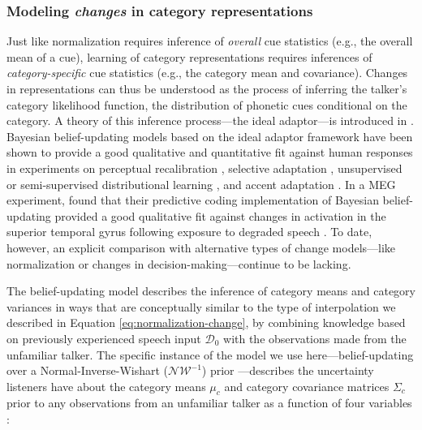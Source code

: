 \documentclass[
  11pt,
  man,floatsintext]{apa6}
\begin{document}
\hypertarget{sec:ideal-adaptor}{%
\subsubsection{\texorpdfstring{Modeling \emph{changes} in category representations}{Modeling changes in category representations}}\label{sec:ideal-adaptor}}

Just like normalization requires inference of \emph{overall} cue statistics (e.g., the overall mean of a cue), learning of category representations requires inferences of \emph{category-specific} cue statistics (e.g., the category mean and covariance). Changes in representations can thus be understood as the process of inferring the talker's category likelihood function, the distribution of phonetic cues conditional on the category. A theory of this inference process---the ideal adaptor---is introduced in \textcite{kleinschmidt-jaeger2015}. Bayesian belief-updating models based on the ideal adaptor framework have been shown to provide a good qualitative and quantitative fit against human responses in experiments on perceptual recalibration \autocites{kleinschmidt-jaeger2011,kleinschmidt-jaeger2012}[for closely related models, see][]{xie2021cognition}, selective adaptation \autocite{kleinschmidt-jaeger2016pbr}, unsupervised or semi-supervised distributional learning \autocites[e.g.,][]{kim2020,kleinschmidt-jaeger2016cogsci,theodore-monto2019}[for closely related model, see][]{bejjanki2011,clayards2008}, and accent adaptation \autocites{hitczenko-feldman2016}[for a closely related model, see][]{tan2021}. In a MEG experiment, \textcite{sohoglu-davis2016} found that their predictive coding implementation of Bayesian belief-updating provided a good qualitative fit against changes in activation in the superior temporal gyrus following exposure to degraded speech \autocite[see also][]{davis-sohoglu2020}. To date, however, an explicit comparison with alternative types of change models---like normalization or changes in decision-making---continue to be lacking.

The belief-updating model describes the inference of category means and category variances in ways that are conceptually similar to the type of interpolation we described in Equation \eqref{eq:normalization-change}, by combining knowledge based on previously experienced speech input \(\mathcal{D}_0\) with the observations made from the unfamiliar talker. The specific instance of the model we use here---belief-updating over a Normal-Inverse-Wishart (\(\mathcal{NW^{-1}}\)) prior \autocite{kleinschmidt-jaeger2015}---describes the uncertainty listeners have about the category means \(\mu_c\) and category covariance matrices \(\Sigma_c\) prior to any observations from an unfamiliar talker as a function of four variables \autocite[p.~132-3]{murphy2012}:
\end{document}
